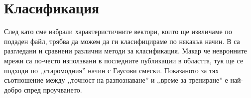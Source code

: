 \documentclass[main.tex]{subfiles}
\begin{document}
\section{Класификация}

След като сме избрали характеристичните вектори, които ще извличаме по подаден файл, трябва да можем да ги класифицираме по някакъв начин.
В \cite{survey} са разгледани и сравнени различни методи за класификация. Макар че невронните мрежи са по-често използвани в последните публикации в областта,
тук ще се подходи по ,,старомодния'' начин с Гаусови смески. Показаното за тях съотношение между ,,точност на разпознаване'' и ,,време за трениране'' е най-добро спред проучването.
\end{document}
